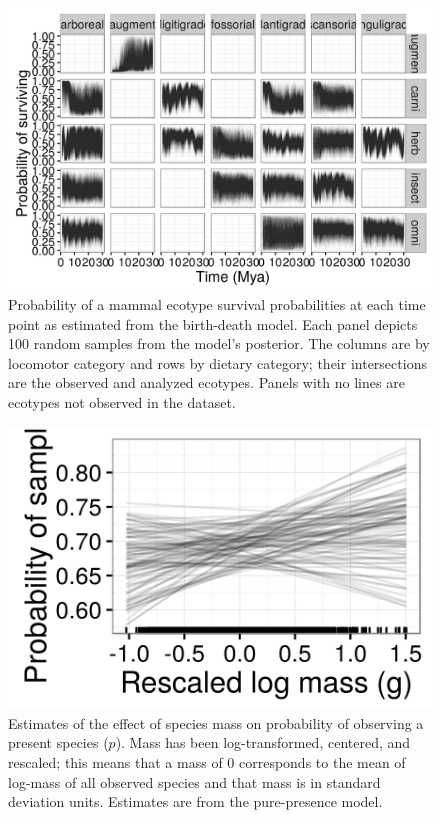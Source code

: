 \documentclass[12pt,letterpaper]{article}
\begin{document}
\begin{figure}[ht]
  \centering
  \includegraphics[width=\textwidth,height=0.8\textheight,keepaspectratio=true]{figure/ecotype_survival_bd}
  \caption[Ecotype survival probability estimated from the birth-death model]{Probability of a mammal ecotype survival probabilities at each time point as estimated from the birth-death model. Each panel depicts 100 random samples from the model's posterior. The columns are by locomotor category and rows by dietary category; their intersections are the observed and analyzed ecotypes. Panels with no lines are ecotypes not observed in the dataset.}
  \label{fig:eco_survival}
\end{figure}

\begin{figure}[ht]
  \centering
  \includegraphics[width=\textwidth,height=0.8\textheight,keepaspectratio=true]{figure/mass_on_samp}
  \caption[Estimates of the effect of mass on observation probability from the pure-presence model]{Estimates of the effect of species mass on probability of observing a present species (\(p\)). Mass has been log-transformed, centered, and rescaled; this means that a mass of 0 corresponds to the mean of log-mass of all observed species and that mass is in standard deviation units. Estimates are from the pure-presence model.}
  \label{fig:mass_preserve_pure_pres}
\end{figure}
\end{document}
